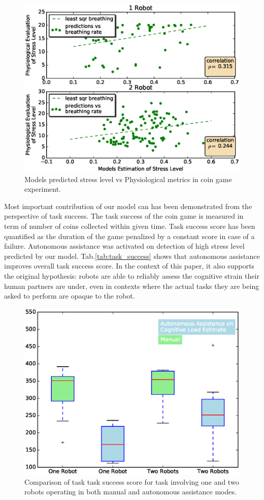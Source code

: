 \documentclass{sig-alternate}
\begin{document}
\begin{figure}  
\centering
\includegraphics[width=.5\textwidth]{prediction_vs_b_p_2.eps}
\caption{Models predicted stress level vs Physiological metrics in coin game experiment.}
\label{fig:pred_phy}
\end{figure}

Most important contribution of our model can has been demonstrated from the perspective of task success. The task
success of the coin game is measured in term of number of coins collected within given time. Task success score has been
quantified as the duration of the game penalized by a constant score in case of a failure. Autonomous assistance was
activated on detection of high stress level predicted by our model. Tab.\ref{tab:task_success} shows that autonomous
assistance improves overall task success score. In the context of this paper, it also supports the original hypothesis:
robots are able to reliably assess the cognitive strain their human partners are under, even in contexts where the
actual tasks they are being asked to perform are opaque to the robot.

\begin{figure}
\centering
\includegraphics[width=.5\textwidth]{BoxWiskerTimesCompMaualVsAuto2.eps}
\caption{Comparison of task task success score for task involving one and two robots operating in both manual and autonomous assistance modes.}
\label{fig:BoxWiskersTimeComp}
\end{figure}
\end{document}
